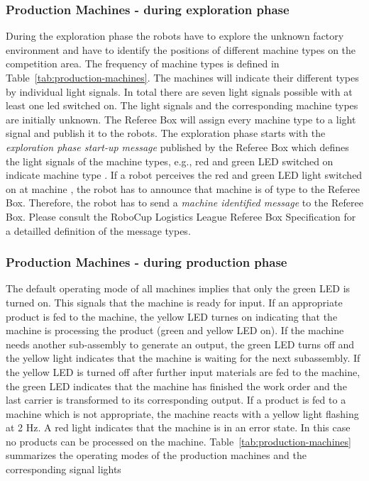 \documentclass[12pt,twoside]{article}
\begin{document}
\subsubsection{Production Machines - during exploration phase}
\label{sec:production-machines-exp}
During the exploration phase the robots have to explore the unknown factory
environment and have to identify the positions of different machine types on the
competition area. The frequency of machine types is defined in
Table~\ref{tab:production-machines}. The machines will indicate their different
types by individual light signals. In total there are seven light signals
possible with at least one led switched on. The light signals and the
corresponding machine types are initially unknown. The Referee Box will assign
every machine type to a light signal and publish it to the robots. The
exploration phase starts with the \emph{exploration phase start-up message}
published by the Referee Box which defines the light signals of the machine types, e.g.,
red and green LED switched on indicate machine type . If a robot perceives
the red and green LED light switched on at machine , the robot has to
announce that machine  is of type  to the Referee Box. Therefore, the
robot has to send a \emph{machine identified message} to the Referee Box. Please
consult the RoboCup Logistics League Referee Box Specification for a detailled
definition of the message types.


\subsubsection{Production Machines - during production phase}
The default operating mode of all machines implies that only the green LED is
turned on. This signals that the machine is ready for input. If an appropriate
product is fed to the machine, the yellow LED turnes on indicating that the
machine is processing the product (green and yellow LED on). If the machine needs another
sub-assembly to generate an output, the green LED turns off and the yellow light
indicates that the machine is waiting for the next subassembly. If the yellow
LED is turned off after further input materials are fed to the machine, the
green LED indicates that the machine has finished the work order and the last
carrier is transformed to its corresponding output. If a product is fed to a
machine which is not appropriate, the machine reacts with a yellow light
flashing at 2 Hz. A red light indicates that the machine is in an error state.
In this case no products can be processed on the machine.
Table~\ref{tab:production-machines} summarizes the operating modes of the
production machines and the corresponding signal lights
\end{document}
